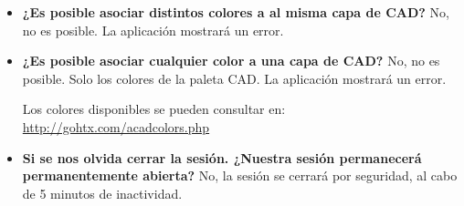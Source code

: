 \begin{itemize}
\item \textbf{\textbf{¿Es posible asociar distintos colores a al misma capa de CAD?}} No, no es posible. La aplicación mostrará un error.

\item \textbf{\textbf{¿Es posible asociar cualquier color a una capa de CAD?}} No, no es posible. Solo los colores de la paleta CAD. La aplicación mostrará un error. 

Los colores disponibles se pueden consultar en: \url{http://gohtx.com/acadcolors.php}

\item \textbf{\textbf{Si se nos olvida cerrar la sesión. ¿Nuestra sesión permanecerá permanentemente abierta?}} No, la sesión se cerrará por seguridad, al cabo de 5 minutos de inactividad.
\end{itemize}